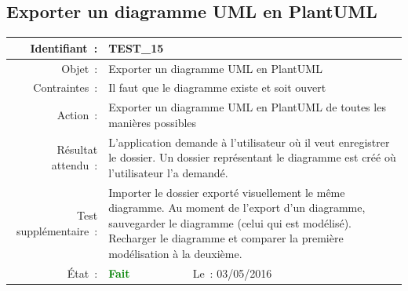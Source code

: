 \documentclass[hidelinks, a4paper,11pt,twoside,final]{article}
\begin{document}
    \subsection*{Exporter un diagramme UML en PlantUML}
    \begin{tabular}{|r|p{5cm}|p{5cm}|}\hline
    {Identifiant~:} & \multicolumn{2}{|p{10cm}|}{TEST\_15} \\\hline
        {Objet~:} & \multicolumn{2}{|p{10cm}|}{Exporter un diagramme UML en PlantUML} \\\hline
        {Contraintes~:} & \multicolumn{2}{|p{10cm}|}{Il faut que le diagramme existe et soit ouvert} \\\hline
        {Action~:} & \multicolumn{2}{|p{10cm}|}{Exporter un diagramme UML en PlantUML de toutes les manières possibles} \\\hline
        {Résultat attendu~:} & \multicolumn{2}{|p{10cm}|}{L’application demande à l’utilisateur où il veut enregistrer le dossier.
                             Un dossier représentant le diagramme est créé où l’utilisateur l’a demandé.} \\\hline
        {Test supplémentaire~:} & \multicolumn{2}{|p{10cm}|}{Importer le dossier exporté visuellement le même diagramme.
							    Au moment de l’export d’un diagramme, sauvegarder le diagramme (celui qui est modélisé).
							    Recharger le diagramme et comparer la première modélisation à la deuxième. } \\\hline
        {État~:} & {\textcolor{green}{\textbf{Fait}}} & {Le~: 03/05/2016 } \\\hline
    \end{tabular}
    \\
    \newline
    
\end{document}

